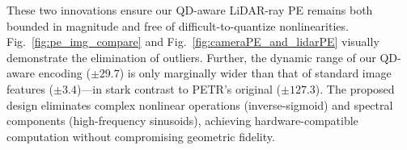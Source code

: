 These two innovations ensure our QD-aware LiDAR-ray PE remains both bounded in magnitude and free of difficult-to-quantize nonlinearities. Fig.~\ref{fig:pe_img_compare} and Fig.~\ref{fig:cameraPE_and_lidarPE} visually demonstrate the elimination of outliers. Further, the dynamic range of our QD-aware encoding ($\pm 29.7$) is only marginally wider than that of standard image features ($\pm 3.4$)—in stark contrast to PETR’s original ($\pm 127.3$). The proposed design eliminates complex nonlinear operations (inverse-sigmoid) and spectral components (high-frequency sinusoids), achieving hardware-compatible computation without compromising geometric fidelity.%



